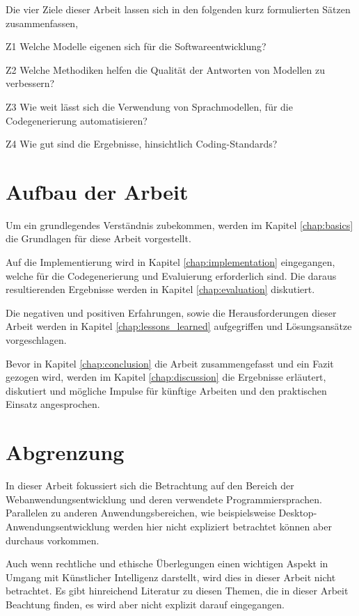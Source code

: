 Die vier Ziele dieser Arbeit lassen sich in den folgenden kurz formulierten Sätzen zusammenfassen,

\begin{myitemize}
	\item[Z1] Welche Modelle eigenen sich für die Softwareentwicklung?
	\item[Z2] Welche Methodiken helfen die Qualität der Antworten von Modellen zu verbessern?
	\item[Z3] Wie weit lässt sich die Verwendung von Sprachmodellen, für die Codegenerierung automatisieren?
	\item[Z4] Wie gut sind die Ergebnisse, hinsichtlich Coding-Standards?
\end{myitemize}



\section{Aufbau der Arbeit}
Um ein grundlegendes Verständnis zubekommen, werden im Kapitel \ref{chap:basics} die Grundlagen für diese Arbeit vorgestellt.\vspace{0.2cm}

Auf die Implementierung wird in Kapitel \ref{chap:implementation} eingegangen, welche für die Codegenerierung und Evaluierung erforderlich sind. Die daraus resultierenden Ergebnisse werden in Kapitel \ref{chap:evaluation} diskutiert.\vspace{0.2cm}

Die negativen und positiven Erfahrungen, sowie die Herausforderungen dieser Arbeit werden in Kapitel \ref{chap:lessons_learned} aufgegriffen und Lösungsansätze vorgeschlagen.\vspace{0.2cm}

Bevor in Kapitel \ref{chap:conclusion} die Arbeit zusammengefasst und ein Fazit gezogen wird, werden im Kapitel \ref{chap:discussion} die Ergebnisse erläutert, diskutiert und mögliche Impulse für künftige Arbeiten und den praktischen Einsatz angesprochen.



\section{Abgrenzung}
In dieser Arbeit fokussiert sich die Betrachtung auf den Bereich der Webanwendungsentwicklung und deren verwendete Programmiersprachen. Parallelen zu anderen Anwendungsbereichen, wie beispielsweise Desktop-Anwendungsentwicklung werden hier nicht expliziert betrachtet können aber durchaus vorkommen.\vspace{0.2cm}

Auch wenn rechtliche und ethische Überlegungen einen wichtigen Aspekt in Umgang mit Künstlicher Intelligenz darstellt, wird dies in dieser Arbeit nicht betrachtet. Es gibt hinreichend Literatur zu diesen Themen, die in dieser Arbeit Beachtung finden, es wird aber nicht explizit darauf eingegangen.

